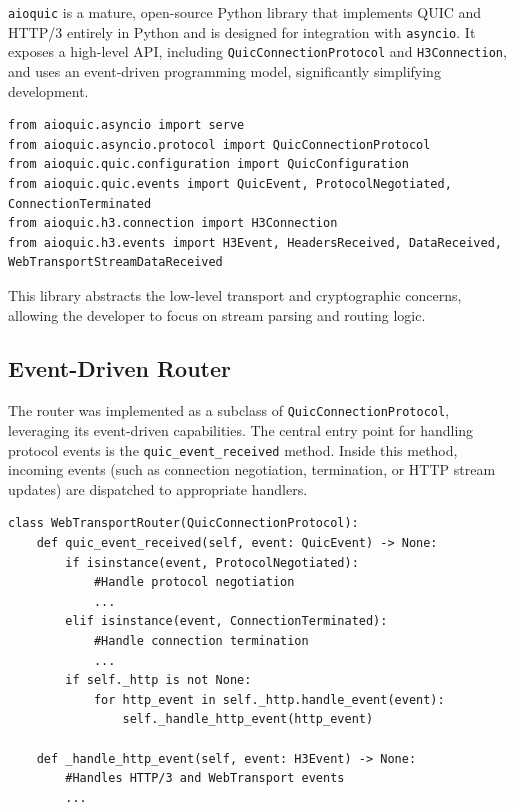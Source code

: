 \texttt{aioquic} is a mature, open-source Python library that implements QUIC and HTTP/3 entirely in Python and is designed for integration with \texttt{asyncio}. It exposes a high-level API, including \texttt{QuicConnectionProtocol} and \texttt{H3Connection}, and uses an event-driven programming model, significantly simplifying development.

\begin{lstlisting}[breaklines=true,basicstyle=\small\ttfamily,frame=single]
from aioquic.asyncio import serve
from aioquic.asyncio.protocol import QuicConnectionProtocol
from aioquic.quic.configuration import QuicConfiguration
from aioquic.quic.events import QuicEvent, ProtocolNegotiated, ConnectionTerminated
from aioquic.h3.connection import H3Connection
from aioquic.h3.events import H3Event, HeadersReceived, DataReceived, WebTransportStreamDataReceived
\end{lstlisting}

This library abstracts the low-level transport and cryptographic concerns, allowing the developer to focus on stream parsing and routing logic.

\subsection{Event-Driven Router}

The router was implemented as a subclass of \texttt{QuicConnectionProtocol}, leveraging its event-driven capabilities. The central entry point for handling protocol events is the \texttt{quic\_event\_received} method. Inside this method, incoming events (such as connection negotiation, termination, or HTTP stream updates) are dispatched to appropriate handlers.

\begin{lstlisting}[breaklines=true,basicstyle=\small\ttfamily,frame=single]
class WebTransportRouter(QuicConnectionProtocol):
    def quic_event_received(self, event: QuicEvent) -> None:
        if isinstance(event, ProtocolNegotiated):
            #Handle protocol negotiation
            ...
        elif isinstance(event, ConnectionTerminated):
            #Handle connection termination
            ...
        if self._http is not None:
            for http_event in self._http.handle_event(event):
                self._handle_http_event(http_event)

    def _handle_http_event(self, event: H3Event) -> None:
        #Handles HTTP/3 and WebTransport events
        ...
\end{lstlisting}


